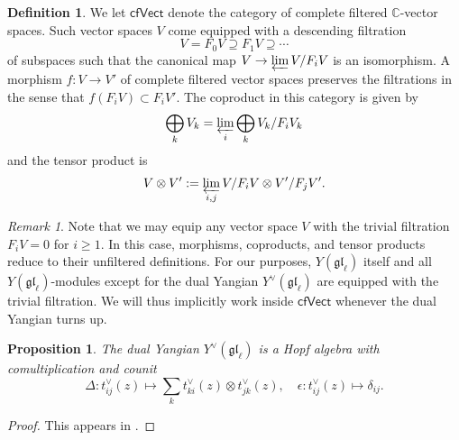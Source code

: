 \documentclass[11pt]{report}
\newtheorem{prop}[theorem]{Proposition}
\theoremstyle{definition}
\newtheorem{definition}[theorem]{Definition}
\theoremstyle{remark}
\newtheorem*{remark}{Remark}
\theoremstyle{remark}
\newcommand{\C}{\mathbb{C}}
\begin{document}
\begin{definition}\label{definition:cfVect}
We let $\mathsf{cfVect}$ denote the category of complete filtered $\C$-vector spaces. Such vector spaces $V$ come equipped with a descending filtration
\begin{equation*}
V = F_0 V \supseteq F_1 V \supseteq \cdots
\end{equation*}
of subspaces such that the canonical map $V \to \varprojlim V/F_i V$ is an isomorphism. A morphism $f: V \to V'$ of complete filtered vector spaces preserves the filtrations in the sense that $f(F_i V) \subset F_i V'$. The coproduct in this category is given by
\begin{equation*}
\bigoplus_k V_k = \varprojlim_i \bigoplus_k V_k/F_i V_k
\end{equation*}
and the tensor product is
\begin{equation*}
V \otimes V' := \varprojlim_{i,j} V/F_i V \otimes V'/F_j V'.
\end{equation*}
\end{definition}

\begin{remark}
Note that we may equip any vector space $V$ with the trivial filtration $F_i V = 0$ for $i \geq 1$. In this case, morphisms, coproducts, and tensor products reduce to their unfiltered definitions. For our purposes, $Y(\mathfrak{gl}_\ell)$ itself and all $Y(\mathfrak{gl}_\ell)$-modules except for the dual Yangian $Y^\vee(\mathfrak{gl}_\ell)$ are equipped with the trivial filtration. We will thus implicitly work inside $\mathsf{cfVect}$ whenever the dual Yangian turns up.
\end{remark}

\begin{prop}
The dual Yangian $Y^\vee(\mathfrak{gl}_\ell)$ is a Hopf algebra with comultiplication and counit
\begin{equation*}
\Delta: t_{ij}^\vee(z) \mapsto \sum_k t_{ki}^\vee(z) \otimes t_{jk}^\vee(z), \quad \epsilon: t_{ij}^\vee(z) \mapsto \delta_{ij}.
\end{equation*}
\end{prop}

\begin{proof}
This appears in \cite{article:nazarov:2019}.
\end{proof}
\end{document}
